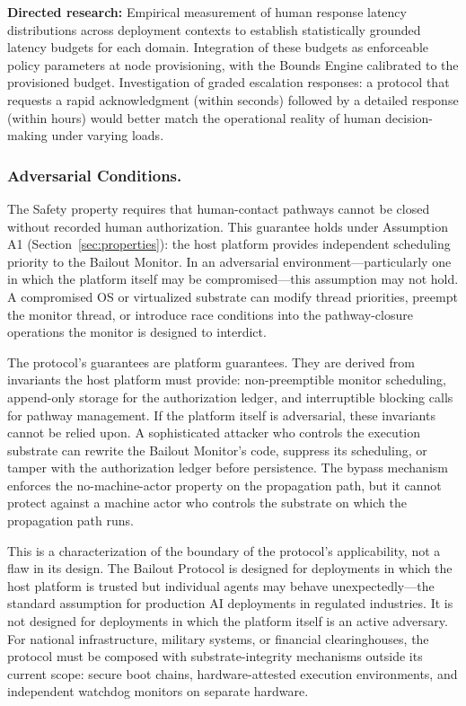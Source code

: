 \textbf{Directed research:} Empirical measurement of human response latency distributions across deployment contexts to establish statistically grounded latency budgets for each domain. Integration of these budgets as enforceable policy parameters at node provisioning, with the Bounds Engine calibrated to the provisioned budget. Investigation of graded escalation responses: a protocol that requests a rapid acknowledgment (within seconds) followed by a detailed response (within hours) would better match the operational reality of human decision-making under varying loads.

\subsubsection{Adversarial Conditions.}

The Safety property requires that human-contact pathways cannot be closed without recorded human authorization. This guarantee holds under Assumption A1 (Section~\ref{sec:properties}): the host platform provides independent scheduling priority to the Bailout Monitor. In an adversarial environment---particularly one in which the platform itself may be compromised---this assumption may not hold. A compromised OS or virtualized substrate can modify thread priorities, preempt the monitor thread, or introduce race conditions into the pathway-closure operations the monitor is designed to interdict.

The protocol's guarantees are platform guarantees. They are derived from invariants the host platform must provide: non-preemptible monitor scheduling, append-only storage for the authorization ledger, and interruptible blocking calls for pathway management. If the platform itself is adversarial, these invariants cannot be relied upon. A sophisticated attacker who controls the execution substrate can rewrite the Bailout Monitor's code, suppress its scheduling, or tamper with the authorization ledger before persistence. The bypass mechanism enforces the no-machine-actor property on the propagation path, but it cannot protect against a machine actor who controls the substrate on which the propagation path runs.

This is a characterization of the boundary of the protocol's applicability, not a flaw in its design. The Bailout Protocol is designed for deployments in which the host platform is trusted but individual agents may behave unexpectedly---the standard assumption for production AI deployments in regulated industries. It is not designed for deployments in which the platform itself is an active adversary. For national infrastructure, military systems, or financial clearinghouses, the protocol must be composed with substrate-integrity mechanisms outside its current scope: secure boot chains, hardware-attested execution environments, and independent watchdog monitors on separate hardware.

